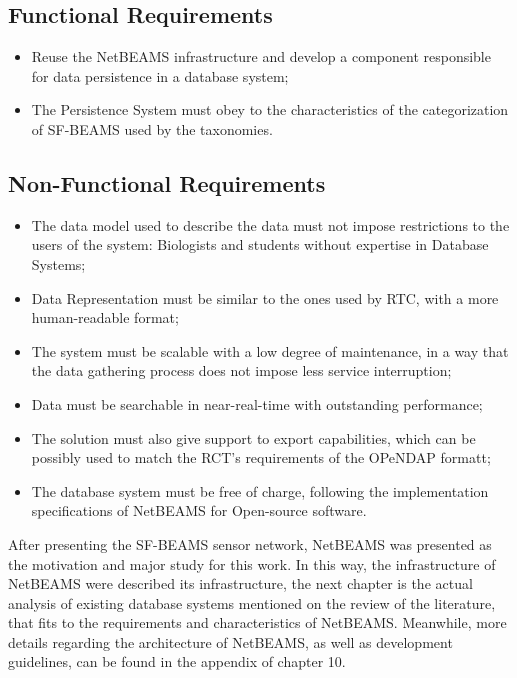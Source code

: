\subsection{Functional Requirements}

\begin{itemize}
  \item Reuse the NetBEAMS infrastructure and develop a component responsible
  for data persistence in a database system;
  \item The Persistence System must obey to the characteristics of the
  categorization of SF-BEAMS used by the taxonomies.
\end{itemize}

\subsection{Non-Functional Requirements}

\begin{itemize}
  \item The data model used to describe the data must not impose restrictions
  to the users of the system: Biologists and students without expertise in
  Database Systems;
  \item Data Representation must be similar to the ones used by RTC, with a
  more human-readable format;
  \item The system must be scalable with a low degree of maintenance, in a
  way that the data gathering process does not impose less service interruption;
  \item Data must be searchable in near-real-time with outstanding performance;
  \item The solution must also give support to export capabilities, which can
  be possibly used to match the RCT's requirements of the OPeNDAP formatt;
  \item The database system must be free of charge, following the
  implementation specifications of NetBEAMS for Open-source software.
\end{itemize}

After presenting the SF-BEAMS sensor network, NetBEAMS was presented as the
motivation and major study for this work. In this way, the infrastructure of
NetBEAMS were described its infrastructure, the next chapter is the actual
analysis of existing database systems mentioned on the review of the
literature, that fits to the requirements and characteristics of NetBEAMS.
Meanwhile, more details regarding the architecture of NetBEAMS, as well as
development guidelines, can be found in the appendix of chapter 10.
